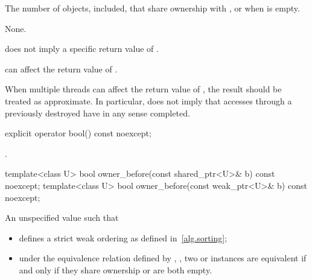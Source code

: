 \begin{itemdescr}
\pnum
\returns
The number of  objects,  included,
that share ownership with , or  when  is
empty.

\pnum
\sync
None.

\pnum
\begin{note}
does not imply a specific return value of .
\end{note}

\pnum
\begin{note}
can affect the return value of .
\end{note}

\pnum
\begin{note}
When multiple threads
can affect the return value of ,
the result should be treated as approximate.
In particular,  does not imply that accesses through
a previously destroyed  have in any sense completed.
\end{note}
\end{itemdescr}

%
\begin{itemdecl}
explicit operator bool() const noexcept;
\end{itemdecl}

\begin{itemdescr}
\pnum
\returns
{}.
\end{itemdescr}

%
\begin{itemdecl}
template<class U> bool owner_before(const shared_ptr<U>& b) const noexcept;
template<class U> bool owner_before(const weak_ptr<U>& b) const noexcept;
\end{itemdecl}

\begin{itemdescr}
\pnum
\returns
An unspecified value such that
\begin{itemize}
\item {} defines a strict weak ordering as defined in~\ref{alg.sorting};

\item under the equivalence relation defined by ,
, two  or
 instances are equivalent if and only if they share ownership or
are both empty.
\end{itemize}

\end{itemdescr}

